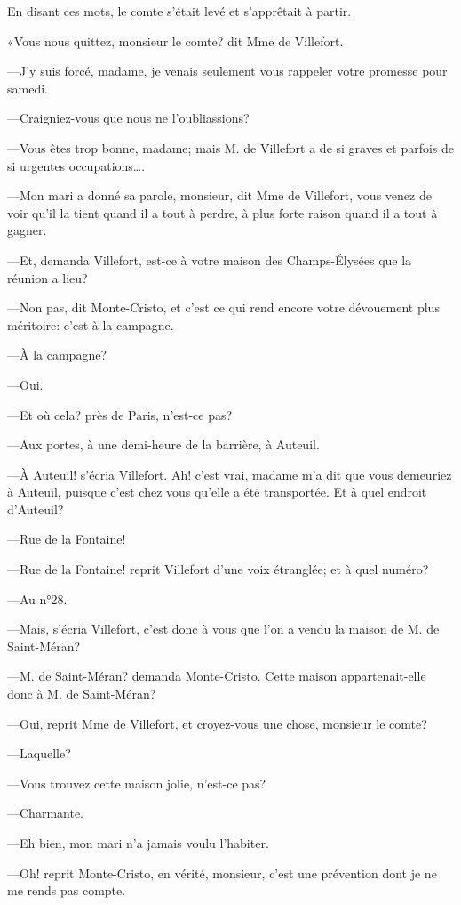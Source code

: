 En disant ces mots, le comte s'était levé et s'apprêtait à partir. 

«Vous nous quittez, monsieur le comte? dit Mme de Villefort. 

—J'y suis forcé, madame, je venais seulement vous rappeler votre promesse pour samedi. 

—Craigniez-vous que nous ne l'oubliassions? 

—Vous êtes trop bonne, madame; mais M. de Villefort a de si graves et parfois de si urgentes occupations\dots. 

—Mon mari a donné sa parole, monsieur, dit Mme de Villefort, vous venez de voir qu'il la tient quand il a tout à perdre, à plus forte raison quand il a tout à gagner. 

—Et, demanda Villefort, est-ce à votre maison des Champs-Élysées que la réunion a lieu? 

—Non pas, dit Monte-Cristo, et c'est ce qui rend encore votre dévouement plus méritoire: c'est à la campagne. 

—À la campagne? 

—Oui. 

—Et où cela? près de Paris, n'est-ce pas? 

—Aux portes, à une demi-heure de la barrière, à Auteuil. 

—À Auteuil! s'écria Villefort. Ah! c'est vrai, madame m'a dit que vous demeuriez à Auteuil, puisque c'est chez vous qu'elle a été transportée. Et à quel endroit d'Auteuil? 

—Rue de la Fontaine! 

—Rue de la Fontaine! reprit Villefort d'une voix étranglée; et à quel numéro? 

—Au n°28. 

—Mais, s'écria Villefort, c'est donc à vous que l'on a vendu la maison de M. de Saint-Méran? 

—M. de Saint-Méran? demanda Monte-Cristo. Cette maison appartenait-elle donc à M. de Saint-Méran? 

—Oui, reprit Mme de Villefort, et croyez-vous une chose, monsieur le comte? 

—Laquelle? 

—Vous trouvez cette maison jolie, n'est-ce pas? 

—Charmante.  

—Eh bien, mon mari n'a jamais voulu l'habiter. 

—Oh! reprit Monte-Cristo, en vérité, monsieur, c'est une prévention dont je ne me rends pas compte. 

